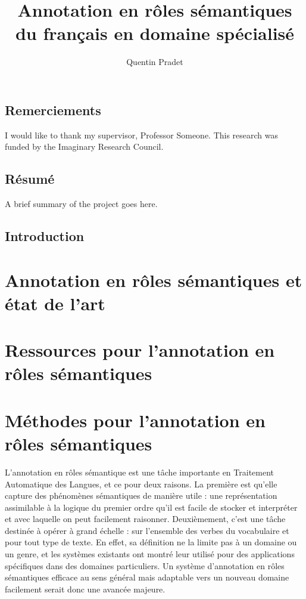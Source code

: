 \documentclass[oneside]{scrbook}
\title{Annotation en rôles sémantiques du français en domaine spécialisé}
\author{Quentin Pradet}
\date{}
\begin{document}
\maketitle

\frontmatter
\tableofcontents
\listoffigures
\listoftables

\chapter{Remerciements}

I would like to thank my supervisor, Professor Someone. This
research was funded by the Imaginary Research Council.

\chapter{Résumé}

A brief summary of the project goes here.


\mainmatter

\chapter{Introduction}
\label{ch:intro}

\part{Annotation en rôles sémantiques et état de l'art}





\part{Ressources pour l'annotation en rôles sémantiques}





\part{Méthodes pour l'annotation en rôles sémantiques}

L'annotation en rôles sémantique est une tâche importante en Traitement Automatique des Langues, et ce pour deux raisons. La première est qu'elle capture des phénomènes sémantiques de manière utile : une représentation assimilable à la logique du premier ordre qu'il est facile de stocker et interpréter et avec laquelle on peut facilement raisonner. Deuxièmement, c'est une tâche destinée à opérer à grand échelle : sur l'ensemble des verbes du vocabulaire et pour tout type de texte. En effet, sa définition ne la limite pas à un domaine ou un genre, et les systèmes existants ont montré leur utilisé pour des applications spécifiques dans des domaines particuliers. Un système d'annotation en rôles sémantiques efficace au sens général mais adaptable vers un nouveau domaine facilement serait donc une avancée majeure.
\end{document}

